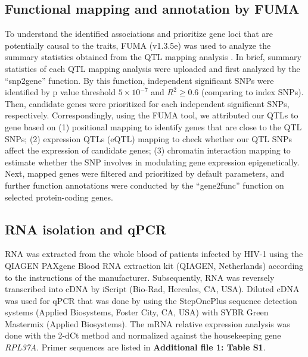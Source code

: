 \documentclass{book}
\begin{document}
\begin{refsection}
\subsection*{Functional mapping and annotation by FUMA}
To understand the identified associations and prioritize gene loci that are potentially causal to the traits, FUMA (v1.3.5e) was used to analyze the summary statistics obtained from the QTL mapping analysis \cite{Watanabe2017Functional}.
In brief, summary statistics of each QTL mapping analysis were uploaded and first analyzed by the ``snp2gene'' function.
By this function, independent significant SNPs were identified by p value threshold $5 \times 10^{-7}$ and $R^2 \ge 0.6$ (comparing to index SNPs).
Then, candidate genes were prioritized for each independent significant SNPs, respectively.
Correspondingly, using the FUMA tool, we attributed our QTLs to gene based on (1) positional mapping to identify genes that are close to the QTL SNPs; (2) expression QTLs (eQTL) mapping to check whether our QTL SNPs affect the expression of candidate genes; (3) chromatin interaction mapping to estimate whether the SNP involves in modulating gene expression epigenetically.
Next, mapped genes were filtered and prioritized by default parameters, and further function annotations were conducted by the ``gene2func'' function on selected protein-coding genes.

\subsection*{RNA isolation and qPCR}
RNA was extracted from the whole blood of patients infected by HIV-1 using the QIAGEN PAXgene Blood RNA extraction kit (QIAGEN, Netherlands) according to the instructions of the manufacturer.
Subsequently, RNA was reversely transcribed into cDNA by iScript (Bio-Rad, Hercules, CA, USA).
Diluted cDNA was used for qPCR that was done by using the StepOnePlus sequence detection systems (Applied Biosystems, Foster City, CA, USA) with SYBR Green Mastermix (Applied Biosystems).
The mRNA relative expression analysis was done with the 2-dCt method and normalized against the housekeeping gene \textit{RPL37A}.
Primer sequences are listed in \textbf{Additional file 1: Table S1}.


\end{refsection}
\end{document}
